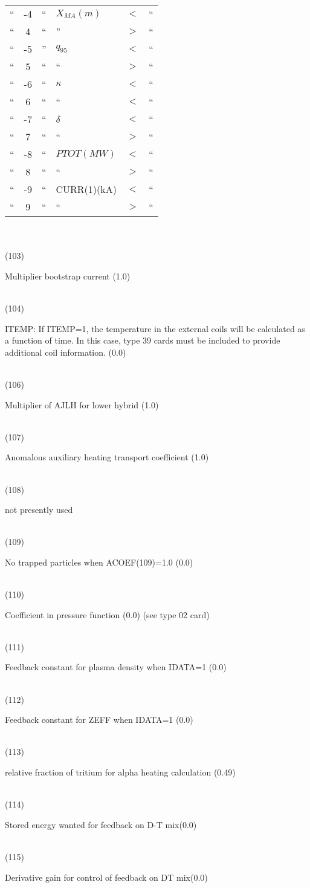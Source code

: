 \begin{tabbing}
\begin{tabular}{lcllll}
``& -4 &`` & $X_{MA}(m)$ & $<$ &``\\
``&  4 &`` &'' & $>$  & ``\\
``& -5 &'' & $q_{95}$  & $<$ & ``\\
``&  5 & `` & `` & $>$ & ``\\
``& -6 & `` & $\kappa$ & $<$ & ``\\
``&  6 & `` & `` & $<$ & ``\\
`` &-7 & `` & $\delta$ & $<$ & ``\\
`` & 7 & `` & `` & $>$ & ``\\
`` &-8 & `` & $PTOT(MW)$ & $<$ & ``\\
`` & 8 & `` & `` & $>$ & ``\\
`` &-9 & `` & CURR(1)(kA) & $<$ & ``\\
`` & 9 & `` & `` & $>$ & ``
\end{tabular}
 \\
 \\
(103) \> \parbox[t]{\width}{Multiplier bootstrap current (1.0)}\\
(104) \> \parbox[t]{\width}{ITEMP: If ITEMP=1, the temperature in the external coils will be calculated as a function of time.  In this case, type 39 cards must be included to provide additional coil information. (0.0)}\\
(106) \> \parbox[t]{\width}{Multiplier of AJLH for lower hybrid (1.0)}\\
(107) \> \parbox[t]{\width}{Anomalous auxiliary heating transport coefficient (1.0)} \\
(108) \> \parbox[t]{\width}{ not presently used}\\
(109) \> \parbox[t]{\width}{No trapped particles when ACOEF(109)=1.0 (0.0)} \\
(110) \> \parbox[t]{\width}{Coefficient in pressure function (0.0) (see type 02 card)}\\
(111) \> \parbox[t]{\width}{Feedback constant for plasma density when IDATA=1 (0.0)}\\
(112) \> \parbox[t]{\width}{Feedback constant for ZEFF when IDATA=1 (0.0)}\\
(113) \> \parbox[t]{\width}{relative fraction of tritium for alpha heating calculation (0.49)}\\
(114) \> \parbox[t]{\width}{Stored energy wanted for feedback on D-T mix(0.0)}\\
(115) \> \parbox[t]{\width}{Derivative gain for control of feedback on DT mix(0.0)}\\

\end{tabbing}
